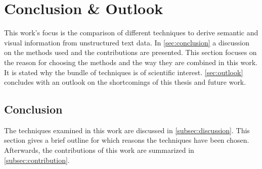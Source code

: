 \chapter{Conclusion \& Outlook}\label{ch:conclusion-outlook}

This work's focus is the comparison of different techniques to derive semantic and visual information from unstructured text data.
In \autoref{sec:conclusion} a discussion on the methods used and the contributions are presented.
This section focuses on the reason for choosing the methods and the way they are combined in this work.
It is stated why the bundle of techniques is of scientific interest.
\autoref{sec:outlook} concludes with an outlook on the shortcomings of this thesis and future work.

\section{Conclusion}\label{sec:conclusion}

The techniques examined in this work are discussed in \autoref{subsec:discussion}.
This section gives a brief outline for which reasons the techniques have been chosen.
Afterwards, the contributions of this work are summarized in \autoref{subsec:contribution}.







